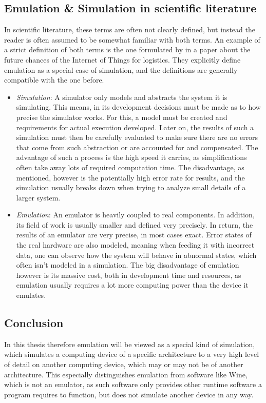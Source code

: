 \subsection{Emulation \& Simulation in scientific literature}
In scientific literature, these terms are often not clearly defined, but instead the reader is often assumed to be somewhat familiar with both terms.
An example of a strict definition of both terms is the one formulated by 
in a paper about the future chances of the Internet of Things for logistics\cite{definition_iot}.
They explicitly define emulation as a special case of simulation,
and the definitions are generally compatible with the one before.
\begin{itemize}
    \item \emph{Simulation}: A simulator only models and abstracts the system it is simulating.
    This means, in its development decisions must be made as to how precise the simulator works.
    For this, a model must be created and requirements for actual execution developed.
    Later on, the results of such a simulation must then be carefully evaluated to make sure
    there are no errors that come from such abstraction or are accounted for and compensated.
    The advantage of such a process is the high speed it carries,
    as simplifications often take away lots of required computation time.
    The disadvantage, as mentioned, however is the potentially high error rate for results,
    and the simulation usually breaks down when trying to analyze small details of a larger system\cite{definition_iot}.
    \item \emph{Emulation}: An emulator is heavily coupled to real components.
    In addition, its field of work is usually smaller and defined very precisely.
    In return, the results of an emulator are very precise, in most cases exact.
    Error states of the real hardware are also modeled, meaning when feeding it with incorrect data,
    one can observe how the system will behave in abnormal states, which often isn't modeled in a simulation.
    The big disadvantage of emulation however is its massive cost,
    both in development time and resources,
    as emulation usually requires a lot more computing power than the device it emulates\cite{definition_iot}.
\end{itemize}

\subsection{Conclusion}\label{sec:conclusion_emulation}
In this thesis therefore emulation will be viewed as a special kind of simulation,
which simulates a computing device of a specific architecture to a very high level of detail
on another computing device, which may or may not be of another architecture.
This especially distinguishes emulation from software like Wine, which is not an emulator,
as such software only provides other runtime software a program requires to function, but does not simulate another device in any way\cite{wine}.

